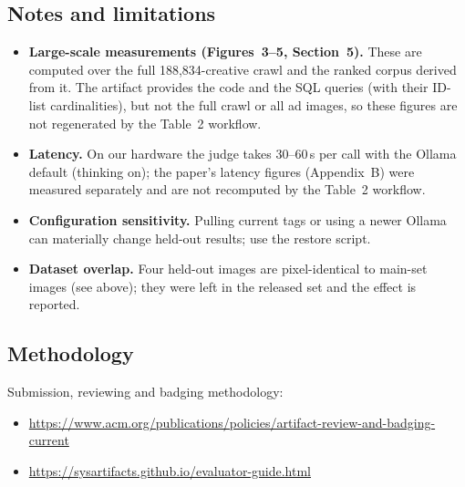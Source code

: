\documentclass[sigconf,nonacm]{acmart}
\begin{document}
\subsection{Notes and limitations}\label{sec:limits}
\begin{itemize}
  \item \textbf{Large-scale measurements (Figures~3--5, Section~5).} These are computed over the full 188{,}834-creative crawl
        and the ranked corpus derived from it. The artifact provides the code and the SQL queries (with their ID-list cardinalities), but not the
        full crawl or all ad images, so these figures are not regenerated by the Table~2 workflow.
  \item \textbf{Latency.} On our hardware the judge takes 30--60\,s per call with the Ollama default (thinking on); the paper's latency figures (Appendix~B) were measured separately and are not recomputed by the Table~2 workflow.
  \item \textbf{Configuration sensitivity.} Pulling current tags or using a newer Ollama can materially change held-out results; use the restore script.
  \item \textbf{Dataset overlap.} Four held-out images are pixel-identical to main-set images (see above); they were left in the released set and the effect is reported.
\end{itemize}

\subsection{Methodology}
Submission, reviewing and badging methodology:
\begin{itemize}
  \item \url{https://www.acm.org/publications/policies/artifact-review-and-badging-current}
  \item \url{https://sysartifacts.github.io/evaluator-guide.html}
\end{itemize}
\end{document}

